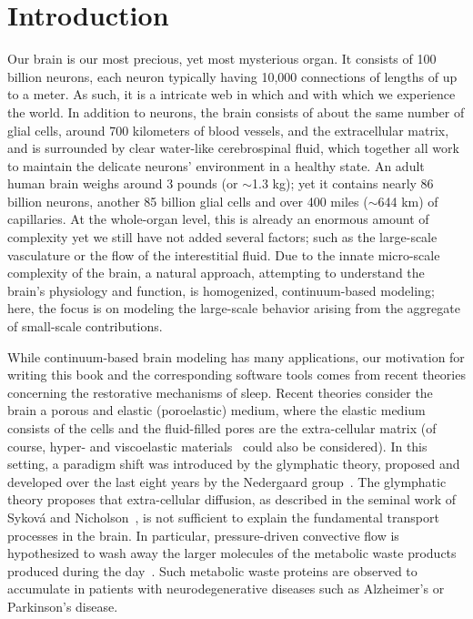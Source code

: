 \chapter{Introduction}
\label{chp:chp1}

Our brain is our most precious, yet most mysterious organ. It consists
of 100 billion neurons, each neuron typically having 10,000 connections
of lengths of up to a meter. As such, it is a intricate web in which
and with which we experience the world. In addition to neurons,
the brain consists of about the same number of glial cells, around 700
kilometers of blood vessels, and the extracellular matrix, and is
surrounded by clear water-like cerebrospinal fluid, which
together all work to maintain the delicate neurons' environment in a
healthy state.  An adult human brain weighs around 3 pounds (or 
$\sim$1.3 kg); yet it contains nearly 86 billion neurons, another 85 billion 
glial cells and over 400 miles ($\sim$644 km) of capillaries.  At the 
whole-organ level, this is already an enormous amount of complexity yet we 
still have not added several factors; such as the large-scale vasculature or 
the flow of the interestitial fluid.  Due to the innate micro-scale complexity 
of the brain,  %
%
a natural approach, attempting to understand the brain's physiology
and function, is homogenized, continuum-based modeling;  here, the 
focus is on modeling the large-scale behavior arising from the aggregate of 
small-scale contributions. 

While continuum-based brain modeling has many applications, our
motivation for writing this book and the corresponding software tools
comes from recent theories concerning the restorative mechanisms of
sleep. Recent theories consider the brain a porous and elastic
(poroelastic) medium, where the elastic medium consists of the cells
and the fluid-filled pores are the extra-cellular matrix (of course, 
hyper- and viscoelastic materials~\cite{goriely2015mechanics,
  budday2019fifty} could also be considered). In this setting, a
paradigm shift was introduced by the glymphatic theory, proposed and
developed over the last eight years by the Nedergaard
group~\cite{iliff2012paravascular}. The glymphatic theory proposes
that extra-cellular diffusion, as described in the seminal work of
Sykov{\'a} and Nicholson~\cite{sykova2008diffusion}, is not sufficient
to explain the fundamental transport processes in the brain. In
particular, pressure-driven convective flow is hypothesized to wash
away the larger molecules of the metabolic waste products produced
during the day~\cite{iliff2012paravascular, jessen2015glymphatic,
  xie2013sleep}. Such metabolic waste proteins are observed to
accumulate in patients with neurodegenerative diseases such as
Alzheimer's or Parkinson's disease.

